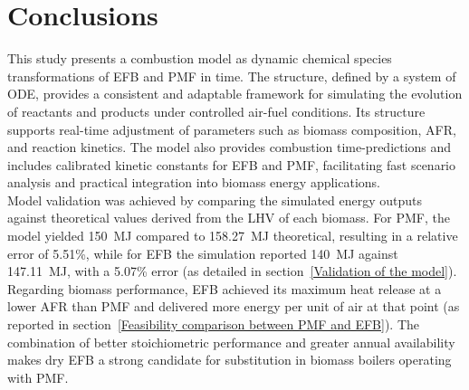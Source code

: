 \documentclass[preprint,12pt]{elsarticle}
\begin{document}


\section{Conclusions}\label{conclusions}

This study presents a combustion model as dynamic chemical species transformations of EFB and PMF in time. The structure, defined by a system of ODE, provides a consistent and adaptable framework for simulating the evolution of reactants and products under controlled air-fuel conditions. Its structure supports real-time adjustment of parameters such as biomass composition, AFR, and reaction kinetics. The model also provides combustion time-predictions and includes calibrated kinetic constants for EFB and PMF, facilitating fast scenario analysis and practical integration into biomass energy applications. \\

Model validation was achieved by comparing the simulated energy outputs against theoretical values derived from the LHV of each biomass. For PMF, the model yielded 150~MJ compared to 158.27~MJ theoretical, resulting in a relative error of 5.51\%, while for EFB the simulation reported 140~MJ against 147.11~MJ, with a 5.07\% error (as detailed in section~\ref{Validation of the model}).\\

Regarding biomass performance, EFB achieved its maximum heat release at a lower AFR than PMF and delivered more energy per unit of air at that point (as reported in section~\ref{Feasibility comparison between PMF and EFB}). The combination of better stoichiometric performance and greater annual availability makes dry EFB a strong candidate for substitution in biomass boilers operating with PMF.\\

\end{document}

